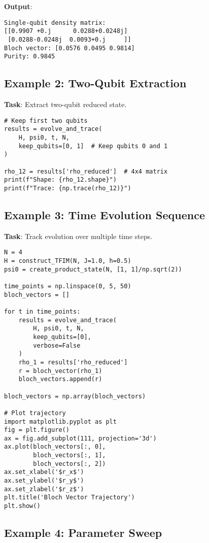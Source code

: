 \documentclass[11pt,a4paper]{article}
\begin{document}
\textbf{Output}:
\begin{verbatim}
Single-qubit density matrix:
[[0.9907 +0.j      0.0288+0.0248j]
 [0.0288-0.0248j  0.0093+0.j     ]]
Bloch vector: [0.0576 0.0495 0.9814]
Purity: 0.9845
\end{verbatim}

\subsection{Example 2: Two-Qubit Extraction}

\textbf{Task}: Extract two-qubit reduced state.

\begin{lstlisting}[caption={Two-qubit extraction}]
# Keep first two qubits
results = evolve_and_trace(
    H, psi0, t, N,
    keep_qubits=[0, 1]  # Keep qubits 0 and 1
)

rho_12 = results['rho_reduced']  # 4x4 matrix
print(f"Shape: {rho_12.shape}")
print(f"Trace: {np.trace(rho_12)}")
\end{lstlisting}

\subsection{Example 3: Time Evolution Sequence}

\textbf{Task}: Track evolution over multiple time steps.

\begin{lstlisting}[caption={Time evolution sequence}]
N = 4
H = construct_TFIM(N, J=1.0, h=0.5)
psi0 = create_product_state(N, [1, 1]/np.sqrt(2))

time_points = np.linspace(0, 5, 50)
bloch_vectors = []

for t in time_points:
    results = evolve_and_trace(
        H, psi0, t, N,
        keep_qubits=[0],
        verbose=False
    )
    rho_1 = results['rho_reduced']
    r = bloch_vector(rho_1)
    bloch_vectors.append(r)

bloch_vectors = np.array(bloch_vectors)

# Plot trajectory
import matplotlib.pyplot as plt
fig = plt.figure()
ax = fig.add_subplot(111, projection='3d')
ax.plot(bloch_vectors[:, 0],
        bloch_vectors[:, 1],
        bloch_vectors[:, 2])
ax.set_xlabel('$r_x$')
ax.set_ylabel('$r_y$')
ax.set_zlabel('$r_z$')
plt.title('Bloch Vector Trajectory')
plt.show()
\end{lstlisting}

\subsection{Example 4: Parameter Sweep}
\end{document}
